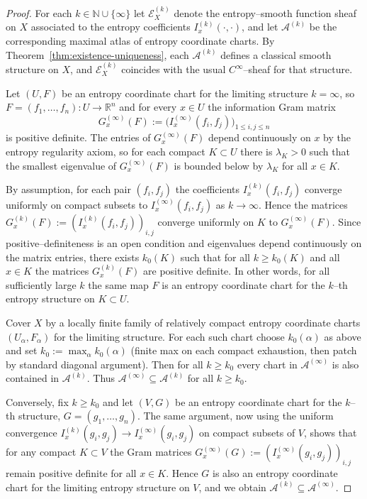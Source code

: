 \documentclass[11pt]{amsart}
\theoremstyle{definition}
\theoremstyle{remark}
\begin{document}
\begin{proof}
For each $k\in\mathbb{N}\cup\{\infty\}$ let $\mathcal{E}^{(k)}_X$ denote the
entropy–smooth function sheaf on $X$ associated to the entropy coefficients
$I^{(k)}_x(\cdot,\cdot)$, and let $\mathcal{A}^{(k)}$ be the corresponding
maximal atlas of entropy coordinate charts. By Theorem~\ref{thm:existence-uniqueness}, each
$\mathcal{A}^{(k)}$ defines a classical smooth structure on $X$, and
$\mathcal{E}^{(k)}_X$ coincides with the usual $C^\infty$–sheaf for that
structure.

Let $(U,F)$ be an entropy coordinate chart for the limiting structure
$k=\infty$, so $F=(f_1,\dots,f_n):U\to\mathbb{R}^n$ and for every $x\in U$ the
information Gram matrix
\[
G^{(\infty)}_x(F)
:=
\bigl(I^{(\infty)}_x(f_i,f_j)\bigr)_{1\le i,j\le n}
\]
is positive definite. The entries of $G^{(\infty)}_x(F)$ depend continuously on
$x$ by the entropy regularity axiom, so for each compact $K\subset U$ there is
$\lambda_K>0$ such that the smallest eigenvalue of $G^{(\infty)}_x(F)$ is
bounded below by $\lambda_K$ for all $x\in K$.

By assumption, for each pair $(f_i,f_j)$ the coefficients
$I^{(k)}_x(f_i,f_j)$ converge uniformly on compact subsets to
$I^{(\infty)}_x(f_i,f_j)$ as $k\to\infty$. Hence the matrices
$G^{(k)}_x(F):=(I^{(k)}_x(f_i,f_j))_{i,j}$ converge uniformly on $K$ to
$G^{(\infty)}_x(F)$. Since positive–definiteness is an open condition and
eigenvalues depend continuously on the matrix entries, there exists $k_0(K)$
such that for all $k\ge k_0(K)$ and all $x\in K$ the matrices $G^{(k)}_x(F)$
are positive definite. In other words, for all sufficiently large $k$ the same
map $F$ is an entropy coordinate chart for the $k$–th entropy structure on
$K\subset U$.

Cover $X$ by a locally finite family of relatively compact entropy coordinate
charts $(U_\alpha,F_\alpha)$ for the limiting structure. For each such chart
choose $k_0(\alpha)$ as above and set $k_0:=\max_\alpha k_0(\alpha)$ (finite
max on each compact exhaustion, then patch by standard diagonal argument). Then
for all $k\ge k_0$ every chart in $\mathcal{A}^{(\infty)}$ is also contained in
$\mathcal{A}^{(k)}$. Thus $\mathcal{A}^{(\infty)}\subseteq\mathcal{A}^{(k)}$ for
all $k\ge k_0$.

Conversely, fix $k\ge k_0$ and let $(V,G)$ be an entropy coordinate chart for
the $k$–th structure, $G=(g_1,\dots,g_n)$. The same argument, now using the
uniform convergence $I^{(k)}_x(g_i,g_j)\to I^{(\infty)}_x(g_i,g_j)$ on compact
subsets of $V$, shows that for any compact $K\subset V$ the Gram matrices
$G^{(\infty)}_x(G):=(I^{(\infty)}_x(g_i,g_j))_{i,j}$ remain positive definite
for all $x\in K$. Hence $G$ is also an entropy coordinate chart for the
limiting entropy structure on $V$, and we obtain
$\mathcal{A}^{(k)}\subseteq\mathcal{A}^{(\infty)}$.


\end{proof}
\end{document}
